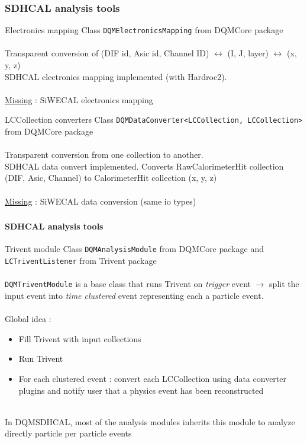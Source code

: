 \documentclass[8pt]{beamer}
\begin{document}
  \begin{frame}[containsverbatim]
    \frametitle{\secname}
    \frametitle{SDHCAL analysis tools}
    \begin{block}{Electronics mapping}
      Class \verb|DQMElectronicsMapping| from DQMCore package \\~\\
      Transparent conversion of (DIF id, Asic id, Channel ID) $\leftrightarrow$ (I, J, layer) $\leftrightarrow$ (x, y, z) \\
      SDHCAL electronics mapping implemented (with Hardroc2). \\~\\
      \underline{Missing} : SiWECAL electronics mapping
    \end{block}
    \begin{block}{LCCollection converters}
      Class \verb|DQMDataConverter<LCCollection, LCCollection>| from DQMCore package \\~\\
      Transparent conversion from one collection to another. \\
      SDHCAL data convert implemented. Converts RawCalorimeterHit collection (DIF, Asic, Channel) to CalorimeterHit collection (x, y, z) \\~\\
      \underline{Missing} : SiWECAL data conversion (same io types) \\
    \end{block}
  \end{frame}


  \begin{frame}[containsverbatim]
    \frametitle{\secname}
    \framesubtitle{SDHCAL analysis tools}
    \begin{block}{Trivent module}
      Class \verb|DQMAnalysisModule| from DQMCore package and \verb|LCTriventListener| from Trivent package\\~\\
      \verb|DQMTriventModule| is a base class that runs Trivent on \textit{trigger} event $\rightarrow$ split the input event into \textit{time clustered} event representing each a particle event. \\~\\
      Global idea :
      \begin{itemize}
        \item Fill Trivent with input collections
        \item Run Trivent
        \item For each clustered event : convert each LCCollection using data converter plugins and notify user that a physics event has been reconstructed
      \end{itemize}
      ~ \\
      In DQMSDHCAL, most of the analysis modules inherits this module to analyze directly particle per particle events
    \end{block}
  \end{frame}
\end{document}
